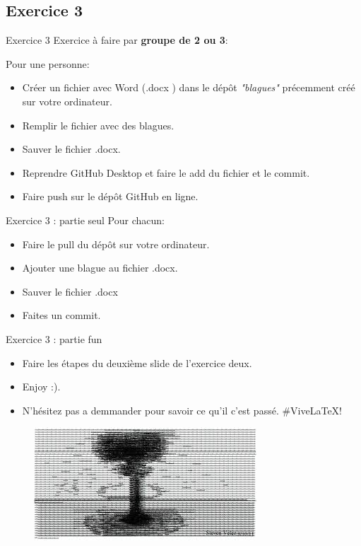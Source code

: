 \documentclass{beamer}
\begin{document}
\subsection{Exercice 3}
\begin{frame}{Exercice 3}
    Exercice à faire par \textbf{groupe de 2 ou 3}:

    Pour une personne:
    \begin{itemize}
        \item Créer un fichier avec Word (.docx ) dans le dépôt \textit{"blagues"} précemment créé sur votre ordinateur.
        \item Remplir le fichier avec des blagues.
        \item Sauver le fichier .docx.
        \item Reprendre GitHub Desktop et faire le add du fichier et le commit.
        \item Faire push sur le dépôt GitHub en ligne.
    \end{itemize}
\end{frame}

\begin{frame}{Exercice 3 : partie seul}
    Pour chacun:
    \begin{itemize}
    \item Faire le pull du dépôt sur votre ordinateur.
    \item Ajouter une blague au fichier .docx.
    \item Sauver le fichier .docx
    \item Faites un commit.
    \end{itemize}
\end{frame}

\begin{frame}{Exercice 3 : partie fun}
    \begin{itemize}
        \item Faire les étapes du deuxième slide de l'exercice deux.
        \item Enjoy :). 
        \item N'hésitez pas a demmander pour savoir ce qu'il c'est passé. \#ViveLaTeX!
    \end{itemize}
    \begin{figure}
    \centering
    \includegraphics[width=.7\textwidth]{img/image_exercices/explosion.jpeg}
    \end{figure}
\end{frame}
\end{document}
